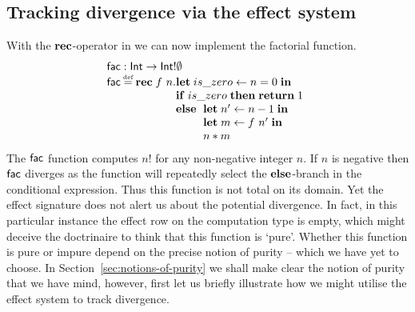 \documentclass[12pt,phd,lfcs,twoside,openright,logo,leftchapter,normalheadings]{infthesis}
\theoremstyle{plain}
\theoremstyle{definition}
\begin{document}
\subsection{Tracking divergence via the effect system}
\label{sec:tracking-div}
%
With the $\mathbf{rec}$-operator in \BCalcRec{} we can now implement the
factorial function.
%
\[
  \bl
    \dec{fac} : \Int \to \Int \eff \emptyset\\
    \dec{fac} \defas \Rec\;f~n.
       \ba[t]{@{}l}
         \Let\;is\_zero \revto n = 0\;\In\\
         \If\;is\_zero\;\Then\; \Return\;1\\
         \Else\;\ba[t]{@{~}l}
                   \Let\; n' \revto n - 1 \;\In\\
                   \Let\; m \revto f~n' \;\In\\
                   n * m
                 \ea
       \ea
  \el
\]
%
The $\mathsf{fac}$ function computes $n!$ for any non-negative integer
$n$. If $n$ is negative then $\mathsf{fac}$ diverges as the function will
repeatedly select the $\mathbf{else}$-branch in the conditional
expression. Thus this function is not total on its domain. Yet the
effect signature does not alert us about the potential divergence. In
fact, in this particular instance the effect row on the computation
type is empty, which might deceive the doctrinaire to think that this
function is `pure'. Whether this function is pure or impure depend on
the precise notion of purity -- which we have yet to choose. In
Section~\ref{sec:notions-of-purity} we shall make clear the notion of
purity that we have mind, however, first let us briefly illustrate how
we might utilise the effect system to track divergence.
\end{document}
